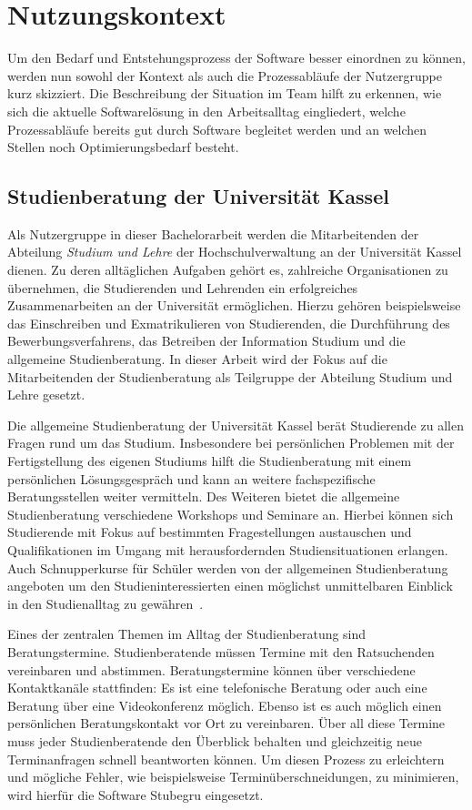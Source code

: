\chapter{Nutzungskontext}
\label{chapter:user-context}

Um den Bedarf und Entstehungsprozess der Software besser einordnen zu können,
werden nun sowohl der Kontext als auch die Prozessabläufe der Nutzergruppe kurz
skizziert. Die Beschreibung der Situation im Team hilft zu erkennen, wie sich
die aktuelle Softwarelösung in den Arbeitsalltag eingliedert, welche
Prozessabläufe bereits gut durch Software begleitet werden und an welchen
Stellen noch Optimierungsbedarf besteht.

\section{Studienberatung der Universität Kassel}
Als Nutzergruppe in dieser Bachelorarbeit werden die Mitarbeitenden der
Abteilung \textit{Studium und Lehre} der Hochschulverwaltung an der Universität
Kassel dienen. Zu deren alltäglichen Aufgaben gehört es, zahlreiche
Organisationen zu übernehmen, die Studierenden und Lehrenden ein erfolgreiches
Zusammenarbeiten an der Universität ermöglichen. Hierzu gehören beispielsweise
das Einschreiben und Exmatrikulieren von Studierenden, die Durchführung des
Bewerbungsverfahrens, das Betreiben der Information Studium und die allgemeine
Studienberatung. In dieser Arbeit wird der Fokus auf die Mitarbeitenden der
Studienberatung als Teilgruppe der Abteilung Studium und Lehre gesetzt.

Die allgemeine Studienberatung der Universität Kassel berät Studierende zu
allen Fragen rund um das Studium. Insbesondere bei persönlichen Problemen mit
der Fertigstellung des eigenen Studiums hilft die Studienberatung mit einem
persönlichen Lösungsgespräch und kann an weitere fachspezifische
Beratungsstellen weiter vermitteln. Des Weiteren bietet die allgemeine
Studienberatung verschiedene Workshops und Seminare an. Hierbei können sich
Studierende mit Fokus auf bestimmten Fragestellungen austauschen und
Qualifikationen im Umgang mit herausfordernden Studiensituationen erlangen.
Auch Schnupperkurse für Schüler werden von der allgemeinen Studienberatung
angeboten um den Studieninteressierten einen möglichst unmittelbaren Einblick
in den Studienalltag zu gewähren~\cite{studBeratungKsWeb}.

Eines der zentralen Themen im Alltag der Studienberatung sind Beratungstermine.
Studienberatende müssen Termine mit den Ratsuchenden vereinbaren und abstimmen.
Beratungstermine können über verschiedene Kontaktkanäle stattfinden: Es ist
eine telefonische Beratung oder auch eine Beratung über eine Videokonferenz
möglich. Ebenso ist es auch möglich einen persönlichen Beratungskontakt vor Ort
zu vereinbaren. Über all diese Termine muss jeder Studienberatende den
Überblick behalten und gleichzeitig neue Terminanfragen schnell beantworten
können. Um diesen Prozess zu erleichtern und mögliche Fehler, wie
beispielsweise Terminüberschneidungen, zu minimieren, wird hierfür die Software
\gls{Stubegru} eingesetzt.

